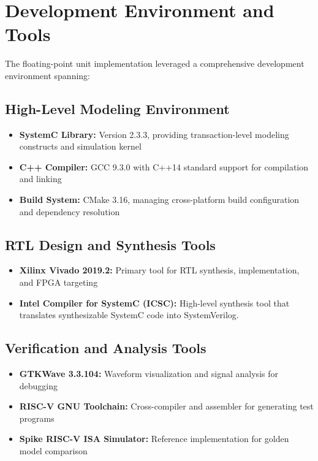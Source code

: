 \section{Development Environment and Tools}
\label{sec:dev_environment}

The floating-point unit implementation leveraged a comprehensive development environment spanning:

\subsection{High-Level Modeling Environment}
\begin{itemize}
\item \textbf{SystemC Library:} Version 2.3.3, providing transaction-level modeling constructs and simulation kernel
\item \textbf{C++ Compiler:} GCC 9.3.0 with C++14 standard support for compilation and linking
\item \textbf{Build System:} CMake 3.16, managing cross-platform build configuration and dependency resolution
\end{itemize}

\subsection{RTL Design and Synthesis Tools}
\begin{itemize}
\item \textbf{Xilinx Vivado 2019.2:} Primary tool for RTL synthesis, implementation, and FPGA targeting
\item \textbf{Intel Compiler for SystemC (ICSC):} High-level synthesis tool that translates synthesizable SystemC code into SystemVerilog.
\end{itemize}

\subsection{Verification and Analysis Tools}
\begin{itemize}
\item \textbf{GTKWave 3.3.104:} Waveform visualization and signal analysis for debugging
\item \textbf{RISC-V GNU Toolchain:} Cross-compiler and assembler for generating test programs
\item \textbf{Spike RISC-V ISA Simulator:} Reference implementation for golden model comparison
\end{itemize}


